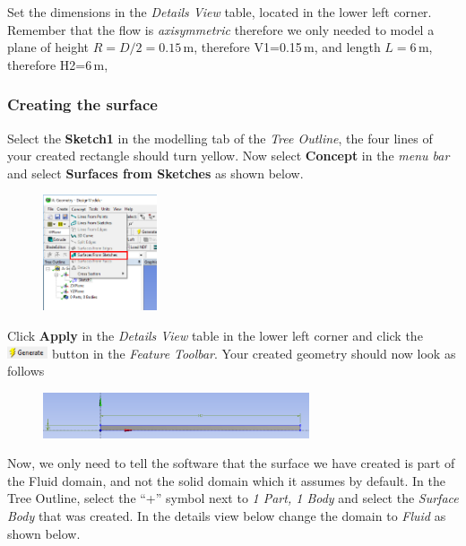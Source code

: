 \documentclass[11pt,a4paper,oneside,hidelinks]{scrartcl}
\newcommand\bfr[1]{\textcolor[rgb]{1,0.00,0.00}{\textbf{\textsf{#1}}}}
\begin{document}
Set the dimensions in the \emph{Details View} table, located in the lower left corner. Remember that the flow is \emph{axisymmetric} therefore we only needed to model a plane of height $R=D/2=0.15\,$m, therefore V1=0.15\,m, and length $L=6$\,m, therefore H2=6\,m,


\subsubsection{Creating the surface}

Select the \bfr{Sketch1} in the modelling tab of the \emph{Tree Outline}, the four lines of your created rectangle should turn yellow. Now select \bfr{Concept} in the \emph{menu bar} and select \bfr{Surfaces from Sketches} as shown below.
\begin{figure}[H]
\begin{center}
\includegraphics[width=0.3\textwidth,clip]{surfaces_from_sketches.png}
\end{center}
\end{figure}

Click \bfr{Apply} in the \emph{Details View} table in the lower left corner and click the \includegraphics[width=1.2cm]{generate_button.png} button in the \emph{Feature Toolbar}. Your created geometry should now look as follows
\begin{figure}[H]
\begin{center}
\includegraphics[width=0.7\textwidth,clip]{pipesurface.png}
\end{center}
\end{figure}

Now, we only need to tell the software that the surface we have created is part of the Fluid domain, and not the solid domain which it assumes by default. In the Tree Outline, select the ``+'' symbol next to \emph{1 Part, 1 Body} and select the \emph{Surface Body} that was created. In the details view below change the domain to \emph{Fluid} as shown below.
\end{document}
